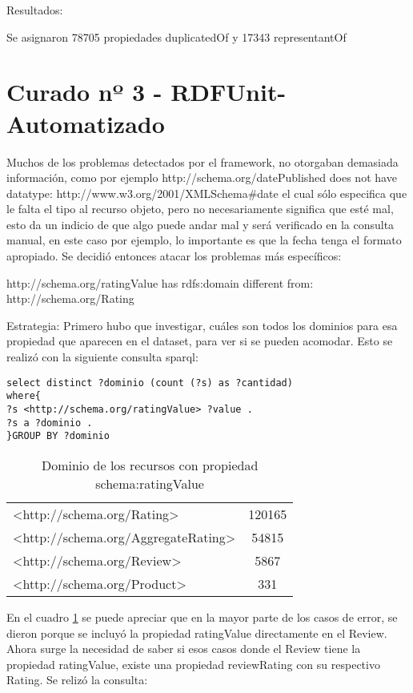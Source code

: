 Resultados:

Se asignaron 78705 propiedades duplicatedOf y 17343 representantOf

\section{Curado nº 3 - RDFUnit-Automatizado}
\label{section:curado-automatizado}

Muchos de los problemas detectados por el framework, no otorgaban demasiada información, como por ejemplo
http://schema.org/datePublished does not have datatype: http://www.w3.org/2001/XMLSchema\#date el cual sólo especifica que le 
falta el tipo al recurso objeto, pero no necesariamente significa que esté mal, esto da un indicio de que algo puede andar mal
y será verificado en la consulta manual, en este caso por ejemplo, lo importante es que la fecha tenga el formato apropiado.
Se decidió entonces atacar los problemas más específicos:

http://schema.org/ratingValue has rdfs:domain different from: \\\noindent http://schema.org/Rating

Estrategia:
Primero hubo que investigar, cuáles son todos los dominios para esa propiedad que aparecen en el dataset, para ver si se pueden 
acomodar. Esto se realizó con la siguiente consulta sparql:

\begin{lstlisting}[frame=single]  
select distinct ?dominio (count (?s) as ?cantidad) 
where{
?s <http://schema.org/ratingValue> ?value .
?s a ?dominio .
}GROUP BY ?dominio
\end{lstlisting}

\begin{table}[h]
\begin{tabular}{| l | c |}
 <http://schema.org/Rating> & 120165\\
 <http://schema.org/AggregateRating> & 54815 \\
 <http://schema.org/Review> & 5867 \\
 <http://schema.org/Product> & 331 \\
\end{tabular}
\caption{Dominio de los recursos con propiedad schema:ratingValue}
\label{table:ratingValueDomains}
\end{table}

En el cuadro \ref{table:ratingValueDomains} se puede apreciar que en la mayor parte de los casos de error, se dieron porque se incluyó la propiedad ratingValue directamente en 
el Review. Ahora surge la necesidad de saber si esos casos donde el Review tiene la propiedad ratingValue, existe una propiedad reviewRating 
con su respectivo Rating.
Se relizó la consulta:

